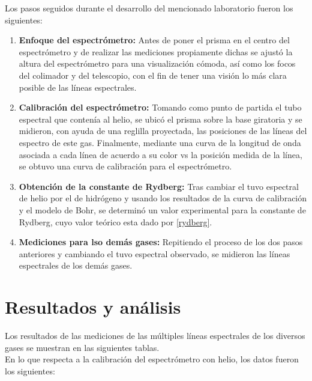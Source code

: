 \documentclass[prb,aps,twocolumn,preprintnumbers,amsmath,amssymb]{revtex4}
\begin{document}
Los pasos seguidos durante el desarrollo del mencionado laboratorio fueron los siguientes:
\\

\begin{enumerate}
	\item \textbf{Enfoque del espectrómetro:} Antes de poner el prisma en el centro del espectrómetro y de realizar las mediciones propiamente dichas se ajustó la altura del espectrómetro para una visualización cómoda, así como los focos del colimador y del telescopio, con el fin de tener una visión lo más clara posible de las líneas espectrales.
	
	\item \textbf{Calibración del espectrómetro:} Tomando como punto de partida el tubo espectral que contenía al helio, se ubicó el prisma sobre la base giratoria y se midieron, con ayuda de una reglilla proyectada, las posiciones de las líneas del espectro de este gas. Finalmente, mediante una curva de la longitud de onda asociada a cada línea de acuerdo a su color vs la posición medida de la línea, se obtuvo una curva de calibración para el espectrómetro.
	
	\item \textbf{Obtención de la constante de Rydberg:} Tras cambiar el tuvo espectral de helio por el de hidrógeno  y usando los resultados de la curva de calibración y el modelo de Bohr, se determinó un valor experimental para la constante de Rydberg, cuyo valor teórico esta dado por \eqref{rydberg}.
	
	\item \textbf{Mediciones para lso demás gases:} Repitiendo el proceso de los dos pasos anteriores y cambiando el tuvo espectral observado, se midieron las líneas espectrales de los demás gases.
\end{enumerate}

\section{Resultados y análisis}

Los resultados de las mediciones de las múltiples líneas espectrales de los diversos gases se muestran en las siguientes tablas.\\

En lo que respecta a la calibración del espectrómetro con helio, los datos fueron los siguientes:
\end{document}
